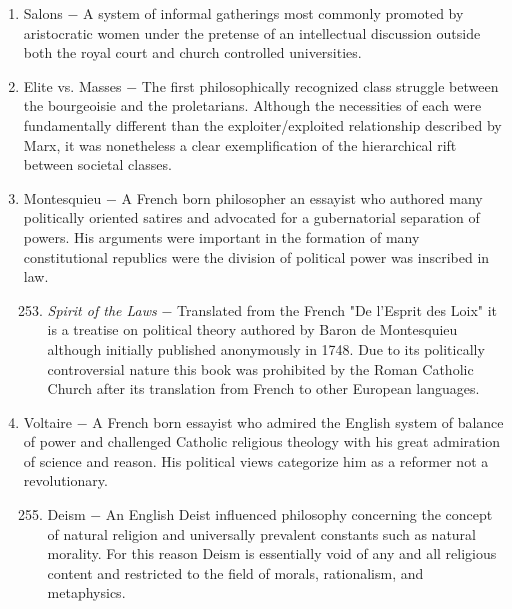 \documentclass[12pt]{article}
\begin{document}
\begin{enumerate}
\item Salons $-$ A system of informal gatherings most commonly promoted by aristocratic women under the pretense of an intellectual discussion outside both the royal court and church controlled universities.

\item Elite vs. Masses $-$ The first philosophically recognized class struggle between the bourgeoisie and the proletarians. Although the necessities of each were fundamentally different than the exploiter/exploited relationship described by Marx, it was nonetheless a clear exemplification of the hierarchical rift between societal classes.

\item Montesquieu $-$ A French born philosopher an essayist who authored many politically oriented satires and advocated for a gubernatorial separation of powers. His arguments were important in the formation of many constitutional republics were the division of political power was inscribed in law.

\begin{enumerate}[label=\arabic{*}.]
\setcounter{enumii}{252}

\item \textit{Spirit of the Laws} $-$ Translated from the French "De l'Esprit des Loix" it is a treatise on political theory authored by Baron de Montesquieu although initially published anonymously in 1748. Due to its politically controversial nature this book was prohibited by the Roman Catholic Church after its translation from French to other European languages.

\end{enumerate}
\setcounter{enumi}{253}

\item Voltaire $-$ A French born essayist who admired the English system of balance of power and challenged Catholic religious theology with his great admiration of science and reason. His political views categorize him as a reformer not a revolutionary.

\begin{enumerate}[label=\arabic{*}.]
\setcounter{enumii}{254}

\item Deism $-$ An English Deist influenced philosophy concerning the concept of natural religion and universally prevalent constants such as natural morality. For this reason Deism is essentially void of any and all religious content and restricted to the field of morals, rationalism, and metaphysics.


\end{enumerate}
\end{enumerate}
\end{document}
